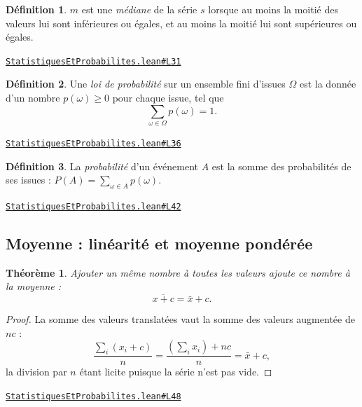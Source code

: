 \documentclass[11pt,a4paper]{article}
\theoremstyle{definition}
\newtheorem{definition}{Définition}
\theoremstyle{plain}
\newtheorem{theoreme}{Théorème}
\newcommand{\source}[2]{\par\smallskip\noindent\hfill{\footnotesize\href{#1}{\texttt{#2}}}\par\smallskip}
\begin{document}
\begin{definition}
$m$ est une \emph{médiane} de la série $s$ lorsque au moins la moitié des valeurs lui
sont inférieures ou égales, et au moins la moitié lui sont supérieures ou égales.
\end{definition}
\source{https://github.com/Commutator-IO/learn-lean/blob/main/cours/01-college/06-statistiques-et-probabilites/StatistiquesEtProbabilites.lean\#L31}{StatistiquesEtProbabilites.lean\#L31}

\begin{definition}
Une \emph{loi de probabilité} sur un ensemble fini d'issues $\Omega$ est la donnée
d'un nombre $p(\omega) \ge 0$ pour chaque issue, tel que
\[ \sum_{\omega \in \Omega} p(\omega) = 1 . \]
\end{definition}
\source{https://github.com/Commutator-IO/learn-lean/blob/main/cours/01-college/06-statistiques-et-probabilites/StatistiquesEtProbabilites.lean\#L36}{StatistiquesEtProbabilites.lean\#L36}

\begin{definition}
La \emph{probabilité} d'un événement $A$ est la somme des probabilités de ses issues :
$P(A) = \sum_{\omega \in A} p(\omega)$.
\end{definition}
\source{https://github.com/Commutator-IO/learn-lean/blob/main/cours/01-college/06-statistiques-et-probabilites/StatistiquesEtProbabilites.lean\#L42}{StatistiquesEtProbabilites.lean\#L42}

\subsection{Moyenne : linéarité et moyenne pondérée}

\begin{theoreme}
Ajouter un même nombre à toutes les valeurs ajoute ce nombre à la moyenne :
\[ \overline{x + c} = \bar{x} + c . \]
\end{theoreme}

\begin{proof}
La somme des valeurs translatées vaut la somme des valeurs augmentée de $nc$ :
\[ \frac{\sum_i (x_i + c)}{n} = \frac{\left(\sum_i x_i\right) + nc}{n}
   = \bar{x} + c , \]
la division par $n$ étant licite puisque la série n'est pas vide.
\end{proof}
\source{https://github.com/Commutator-IO/learn-lean/blob/main/cours/01-college/06-statistiques-et-probabilites/StatistiquesEtProbabilites.lean\#L48}{StatistiquesEtProbabilites.lean\#L48}
\end{document}
